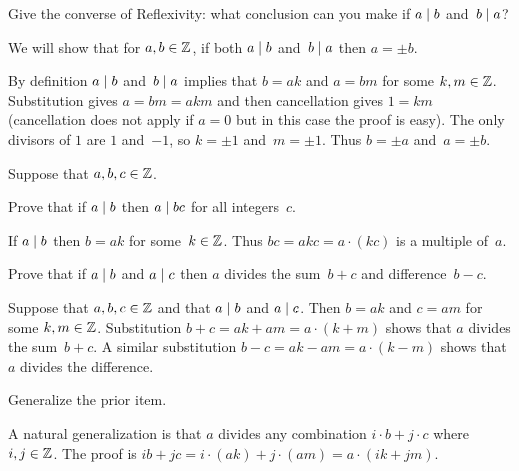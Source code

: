 \documentclass{ibl}  %
\begin{document}
\begin{problem}
Give the converse of Reflexivity: what conclusion can you make
if $a\mid b$ and~$b\mid a$?
\begin{ans}
We will show that for $a,b\in\mathbb{Z}$, if both $a\mid b$ and~$b\mid a$
then $a=\pm b$.

By definition $a\mid b$ and~$b\mid a$ implies that $b=ak$
and $a=bm$ for some $k,m\in\mathbb{Z}$.
Substitution gives $a=bm=akm$ and then cancellation gives $1=km$ (cancellation
does not apply if $a=0$ but in this case the proof is easy).
The only divisors of $1$ are $1$ and~$-1$, so $k=\pm 1$ and~$m=\pm 1$. 
Thus $b=\pm a$ and~$a=\pm b$.
\end{ans}
\end{problem}

\begin{problem} \label{ex:DividesAndLinearCombinations}
Suppose that $a,b,c\in\mathbb{Z}$.
\begin{exes}
\begin{exercise}
  Prove that if $a\mid b$ then $a\mid bc$ for all integers~$c$.
\end{exercise}
\begin{answer}
  If $a\mid b$ then $b=ak$ for some~$k\in\mathbb{Z}$.
  Thus $bc=akc=a\cdot(kc)$ is a multiple of~$a$.
\end{answer}
\begin{exercise}
  Prove that if $a\mid b$ and $a\mid c$ then $a$ divides the 
  sum~$b+c$ and difference~$b-c$.
\end{exercise}
\begin{answer}
  Suppose that $a,b,c\in\mathbb{Z}$ and that $a\mid b$ and $a\mid c$.
  Then $b=ak$ and $c=am$ for some $k,m\in\mathbb{Z}$. 
  Substitution  
  $b+c=ak+am=a\cdot(k+m)$
  shows that $a$ divides the sum~$b+c$.
  A similar substitution
  $b-c=ak-am=a\cdot(k-m)$
  shows that $a$ divides the difference.
\end{answer}
\begin{exercise}  %
   Generalize the prior item.
\end{exercise}
\begin{answer}
  A natural generalization is that $a$ divides any combination
  $i\cdot b+j\cdot c$ where $i,j\in\mathbb{Z}$.
  The proof is
  $ib+jc=i\cdot (ak)+j\cdot(am)=a\cdot(ik+jm)$.
\end{answer}
\end{exes}

\end{problem}
\end{document}

